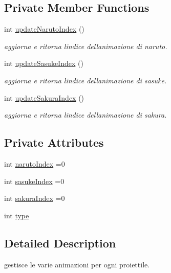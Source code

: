 \subsection*{Private Member Functions}
\begin{DoxyCompactItemize}
\item 
int \hyperlink{classtowers_1_1_attack_animation_a9a43224ece8c2b408bea79a17a40926a}{update\+Naruto\+Index} ()
\begin{DoxyCompactList}\small\item\em aggiorna e ritorna l\textquotesingle{}indice dell\textquotesingle{}animazione di naruto. \end{DoxyCompactList}\item 
int \hyperlink{classtowers_1_1_attack_animation_a6b8b22718154d24a23128663058f8780}{update\+Sasuke\+Index} ()
\begin{DoxyCompactList}\small\item\em aggiorna e ritorna l\textquotesingle{}indice dell\textquotesingle{}animazione di sasuke. \end{DoxyCompactList}\item 
int \hyperlink{classtowers_1_1_attack_animation_a1f8c2a2ac98f9746a0175442814aca4b}{update\+Sakura\+Index} ()
\begin{DoxyCompactList}\small\item\em aggiorna e ritorna l\textquotesingle{}indice dell\textquotesingle{}animazione di sakura. \end{DoxyCompactList}\end{DoxyCompactItemize}
\subsection*{Private Attributes}
\begin{DoxyCompactItemize}
\item 
int \hyperlink{classtowers_1_1_attack_animation_a0d5d70f714c6c696174fc8b20caab8de}{naruto\+Index} =0
\item 
int \hyperlink{classtowers_1_1_attack_animation_a607a6f73da61681d9d1d693943346acf}{sasuke\+Index} =0
\item 
int \hyperlink{classtowers_1_1_attack_animation_a9717cb2cb5245abda5bdc9c80b1eb416}{sakura\+Index} =0
\item 
int \hyperlink{classtowers_1_1_attack_animation_ac765329451135abec74c45e1897abf26}{type}
\end{DoxyCompactItemize}


\subsection{Detailed Description}
gestisce le varie animazioni per ogni proiettile. 

